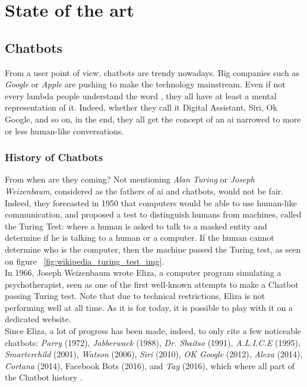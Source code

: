 \chapter{State of the art}
\label{chap:state-of-the-art}

\section{Chatbots}
From a user point of view, chatbots are trendy nowadays. Big companies such as \textit{Google} or \textit{Apple} are pushing to make the technology mainstream. Even if not every lambda people understand the word , they all have at least a mental representation of it. Indeed, whether they call it Digital Assistant, Siri, Ok Google, and so on, in the end, they all get the concept of an \gls{ai} narrowed to more or less human-like conversations.

\subsection{History of Chatbots}
From when are they coming? Not mentioning \textit{Alan Turing} or \textit{Joseph Weizenbaum}, considered as the fathers of \gls{ai} and chatbots, would not be fair. Indeed, they forecasted in 1950 that computers would be able to use human-like communication, and proposed a test to distinguish humans from machines, called the Turing Test\cite{paper:turing}: where a human is asked to talk to a masked entity and determine if he is talking to a human or a computer. If the human cannot determine who is the computer, then the machine passed the Turing test, as seen on figure ~\ref{fig:wikipedia_turing_test_img}. \\

In 1966, Joseph Weizenbaum wrote Eliza\cite{chatbot:eliza}, a computer program simulating a psychotherapist, seen as one of the first well-known attempts to make a Chatbot passing Turing test. Note that due to technical restrictions, Eliza is not performing well at all time. As it is for today, it is possible to play with it on a dedicated website.\\

Since Eliza, a lot of progress has been made, indeed, to only cite a few noticeable chatbots: \textit{Parry}\cite{chatbot:parry} (1972), \textit{Jabberwack}\cite{chatbot:jabberwack} (1988), \textit{Dr. Sbaitso}\cite{chatbot:dr-sbaitso} (1991), \textit{A.L.I.C.E}\cite{chatbot:alice} (1995), \textit{Smarterchild}\cite{chatbot:smarterchild} (2001), \textit{Watson}\cite{chatbot:watson} (2006), \textit{Siri}\cite{chatbot:siri} (2010), \textit{OK Google}\cite{chatbot:google} (2012), \textit{Alexa}\cite{chatbot:alexa} (2014), \textit{Cortana}\cite{chatbot:cortana} (2014), Facebook Bots\cite{chatbot:facebook} (2016), and \textit{Tay}\cite{chatbot:tay} (2016), which where all part of the Chatbot history \cite{chatbot:futurism_history_infography}.\\

